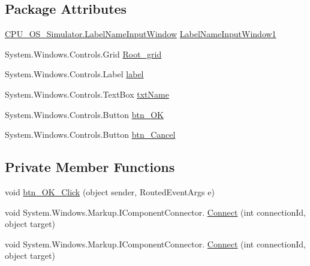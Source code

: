 \subsection*{Package Attributes}
\begin{DoxyCompactItemize}
\item 
\hyperlink{class_c_p_u___o_s___simulator_1_1_label_name_input_window}{C\+P\+U\+\_\+\+O\+S\+\_\+\+Simulator.\+Label\+Name\+Input\+Window} \hyperlink{class_c_p_u___o_s___simulator_1_1_label_name_input_window_ae2f7a4e3127730ff88d884ac33aee1b9}{Label\+Name\+Input\+Window1}
\item 
System.\+Windows.\+Controls.\+Grid \hyperlink{class_c_p_u___o_s___simulator_1_1_label_name_input_window_a7946e0fa5aa75a769ad4305a82f04fae}{Root\+\_\+grid}
\item 
System.\+Windows.\+Controls.\+Label \hyperlink{class_c_p_u___o_s___simulator_1_1_label_name_input_window_a8ca5202ae057b779e74d58646c663d14}{label}
\item 
System.\+Windows.\+Controls.\+Text\+Box \hyperlink{class_c_p_u___o_s___simulator_1_1_label_name_input_window_aabb275d4d1c6914f2f56f8707befeee4}{txt\+Name}
\item 
System.\+Windows.\+Controls.\+Button \hyperlink{class_c_p_u___o_s___simulator_1_1_label_name_input_window_a4ff61d91969c253a8f37f0079d62bf43}{btn\+\_\+\+O\+K}
\item 
System.\+Windows.\+Controls.\+Button \hyperlink{class_c_p_u___o_s___simulator_1_1_label_name_input_window_a409c16e5105450841ff7dd21628a98b9}{btn\+\_\+\+Cancel}
\end{DoxyCompactItemize}
\subsection*{Private Member Functions}
\begin{DoxyCompactItemize}
\item 
void \hyperlink{class_c_p_u___o_s___simulator_1_1_label_name_input_window_a0e960776b394d08aa5aa80709e225f14}{btn\+\_\+\+O\+K\+\_\+\+Click} (object sender, Routed\+Event\+Args e)
\item 
void System.\+Windows.\+Markup.\+I\+Component\+Connector. \hyperlink{class_c_p_u___o_s___simulator_1_1_label_name_input_window_aaa1faa2316db157e63bbe3f2e328becd}{Connect} (int connection\+Id, object target)
\item 
void System.\+Windows.\+Markup.\+I\+Component\+Connector. \hyperlink{class_c_p_u___o_s___simulator_1_1_label_name_input_window_aaa1faa2316db157e63bbe3f2e328becd}{Connect} (int connection\+Id, object target)
\end{DoxyCompactItemize}
